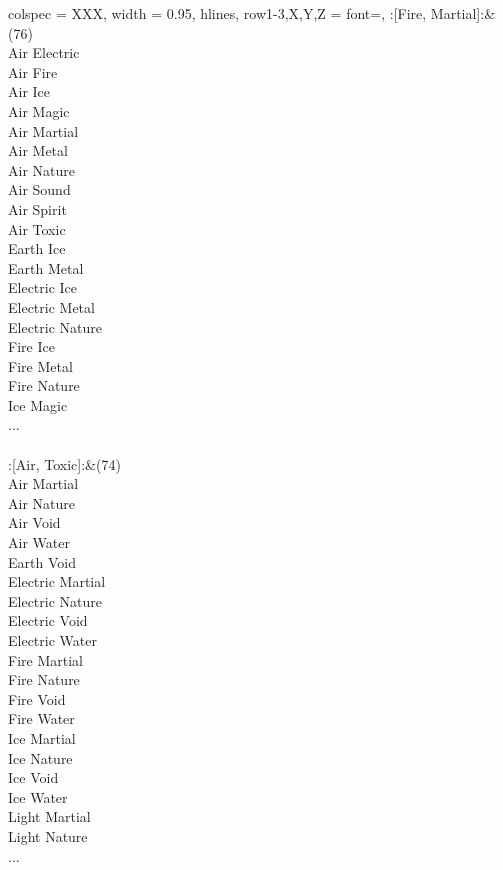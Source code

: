 \begin{longtblr}[
	caption = {2v2 Defending Weak},
	label = {2v2-Defending-Weak},
]{
	colspec = {XXX}, width = 0.95\linewidth,
	hlines,
	row{1-3,X,Y,Z} = {font=\bfseries},
}
	:[Fire, Martial]:&{(76)\\
	Air Electric \\
	Air Fire \\
	Air Ice \\
	Air Magic \\
	Air Martial \\
	Air Metal \\
	Air Nature \\
	Air Sound \\
	Air Spirit \\
	Air Toxic \\
	Earth Ice \\
	Earth Metal \\
	Electric Ice \\
	Electric Metal \\
	Electric Nature \\
	Fire Ice \\
	Fire Metal \\
	Fire Nature \\
	Ice Magic \\
	...\\
	}\\

	:[Air, Toxic]:&{(74)\\
	Air Martial \\
	Air Nature \\
	Air Void \\
	Air Water \\
	Earth Void \\
	Electric Martial \\
	Electric Nature \\
	Electric Void \\
	Electric Water \\
	Fire Martial \\
	Fire Nature \\
	Fire Void \\
	Fire Water \\
	Ice Martial \\
	Ice Nature \\
	Ice Void \\
	Ice Water \\
	Light Martial \\
	Light Nature \\
	...\\
	}\\


\end{longtblr}
